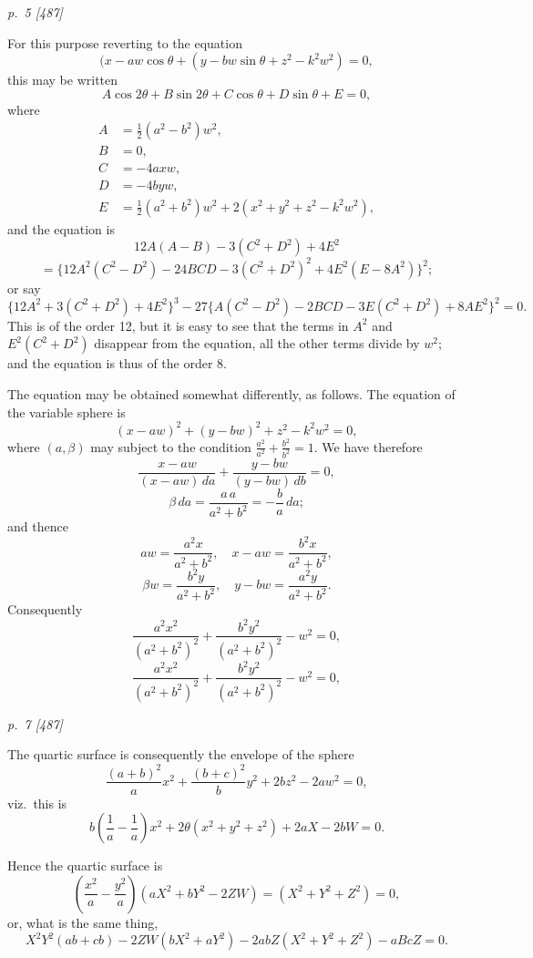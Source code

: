 \documentclass[11pt,a4paper]{book}
\begin{document}
\clearpage

\bigskip
\textit{p.~5 [487]}
\smallskip

For this purpose reverting to the equation
\[
(x - aw\cos\theta + (y - bw\sin\theta + z^2 - k^2 w^2) = 0,
\]
this may be written
\[
A \cos 2\theta + B \sin 2\theta + C \cos \theta + D \sin \theta + E = 0,
\]
where
\begin{align*}
A &= \tfrac{1}{2}(a^2 - b^2)w^2, \\
B &= 0, \\
C &= -4axw, \\
D &= -4byw, \\
E &= \tfrac{1}{2}(a^2 + b^2)w^2 + 2(x^2 + y^2 + z^2 - k^2 w^2),
\end{align*}
and the equation is
\[
12A(A - B) - 3(C^2 + D^2) + 4E^2
\]
\[
= \{12A^2(C^2 - D^2) - 24BCD - 3(C^2 + D^2)^2 + 4E^2(E - 8A^2)\}^2;
\]
or say
\[
\{12A^2 + 3(C^2 + D^2) + 4E^2\}^3 - 27\{A(C^2 - D^2) - 2BCD - 3E(C^2 + D^2) + 8AE^2\}^2 = 0.
\]
This is of the order 12, but it is easy to see that the terms in $A^2$ and $E^2 (C^2 + D^2)$
disappear from the equation, all the other terms divide by $w^2$; and the equation is
thus of the order 8.

The equation may be obtained somewhat differently, as follows. The equation of
the variable sphere is
\[
(x - aw)^2 + (y - bw)^2 + z^2 - k^2 w^2 = 0,
\]
where $(a, \beta)$ may subject to the condition $\frac{a^2}{a^2} + \frac{b^2}{b^2} = 1$.  We have therefore
\[
\frac{x - aw}{(x - aw)\,da} + \frac{y - bw}{(y - bw)\,db} = 0,
\]
\[
\beta\,da = \frac{a\,a}{a^2 + b^2} = -\frac{b}{a} \, da;
\]
and thence
\[
aw = \frac{a^2 x}{a^2 + b^2}, \quad x - aw = \frac{b^2 x}{a^2 + b^2},
\]
\[
\beta w = \frac{b^2 y}{a^2 + b^2}, \quad y - bw = \frac{a^2 y}{a^2 + b^2}.
\]
Consequently
\[
\frac{a^2 x^2}{(a^2 + b^2)^2}+\frac{b^2 y^2}{(a^2 + b^2)^2}- w^2 = 0,
\]
\[
\frac{a^2 x^2}{(a^2 + b^2)^2}+\frac{b^2 y^2}{(a^2 + b^2)^2}-w^2 = 0,
\]

\clearpage

\bigskip
\textit{p.~7 [487]}
\smallskip

The quartic surface is consequently the envelope of the sphere
\[
\frac{(a + b)^2}{a} x^2 + \frac{(b + c)^2}{b} y^2 + 2 b z^2 - 2 a w^2 = 0,
\]
viz.\ this is
\[
b\left(\frac{1}{a} - \frac{1}{a}\right) x^2 + 2\theta (x^2 + y^2 + z^2) + 2aX - 2bW = 0.
\]

Hence the quartic surface is
\[
\left(\frac{x^2}{a} - \frac{y^2}{a}\right)(aX^2 + bY^2 - 2 ZW) = (X^2 + Y^2 + Z^2) = 0,
\]
or, what is the same thing,
\[
X^2 Y^2 (ab + cb) - 2ZW (bX^2 + a Y^2) - 2abZ(X^2 + Y^2 + Z^2) - aBcZ = 0.
\]
\end{document}
